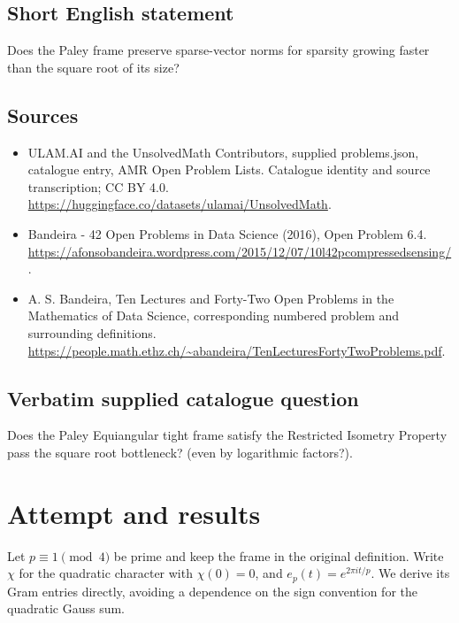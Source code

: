 \documentclass[11pt]{article}
\begin{document}
\subsection{Short English statement}
Does the Paley frame preserve sparse-vector norms for sparsity growing faster than the square root of its size?
\subsection{Sources}
\begin{itemize}
\item[S1] ULAM.AI and the UnsolvedMath Contributors, supplied problems.json, catalogue entry, AMR Open Problem Lists. Catalogue identity and source transcription; CC BY 4.0.
\url{https://huggingface.co/datasets/ulamai/UnsolvedMath}.
\item[S2] Bandeira - 42 Open Problems in Data Science (2016), Open Problem 6.4. 
\url{https://afonsobandeira.wordpress.com/2015/12/07/10l42pcompressedsensing/}.
\item[S3] A. S. Bandeira, Ten Lectures and Forty-Two Open Problems in the Mathematics of Data Science, corresponding numbered problem and surrounding definitions.
\url{https://people.math.ethz.ch/~abandeira/TenLecturesFortyTwoProblems.pdf}.
\end{itemize}
\subsection{Verbatim supplied catalogue question}
Does the Paley Equiangular tight frame satisfy the Restricted Isometry Property pass the square root bottleneck? (even by logarithmic factors?).

\section{Attempt and results}
Let $p\equiv1\pmod4$ be prime and keep the frame in the original definition.
Write $\chi$ for the quadratic character with $\chi(0)=0$, and
$e_p(t)=e^{2\pi it/p}$. We derive its Gram entries directly, avoiding a
dependence on the sign convention for the quadratic Gauss sum.
\end{document}
